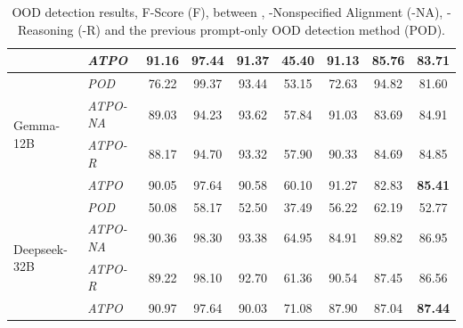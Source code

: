\begin{table}[t!]
{\begin{tabular}{|l|l|ccccccc|}
                             &  \cellcolor{rowGray} \textit{ATPO}  &  \cellcolor{rowGray} 91.16 &  \cellcolor{rowGray} 97.44 &   \cellcolor{rowGray} 91.37 & \cellcolor{rowGray} 45.40 &  \cellcolor{rowGray} 91.13 &   \cellcolor{rowGray} 85.76 &    \multicolumn{1}{|c|}{\cellcolor{rowGray} \textbf{83.71}}  \\  \hline
\multirow{4}{*}{Gemma-12B}   &   \textit{POD}   &   76.22  &    99.37  &   93.44  &    53.15  &   72.63  &   94.82  &    \multicolumn{1}{|c|}{81.60} \\
                             &  \cellcolor{rowGray} \textit{ATPO-NA}  &   \cellcolor{rowGray} 89.03 &    \cellcolor{rowGray} 94.23 &  \cellcolor{rowGray} 93.62 &  \cellcolor{rowGray} 57.84 &    \cellcolor{rowGray} 91.03 &  \cellcolor{rowGray} 83.69 &    \multicolumn{1}{|c|}{ \cellcolor{rowGray} 84.91} \\ %
                             &  \cellcolor{rowGray} \textit{ATPO-R}  &   \cellcolor{rowGray} 88.17 &   \cellcolor{rowGray} 94.70 &  \cellcolor{rowGray} 93.32 &  \cellcolor{rowGray} 57.90 &   \cellcolor{rowGray} 90.33 &   \cellcolor{rowGray} 84.69 &    \multicolumn{1}{|c|}{ \cellcolor{rowGray} 84.85} \\
                             &  \cellcolor{rowGray} \textit{ATPO}  &   \cellcolor{rowGray} 90.05 &  \cellcolor{rowGray} 97.64 &   \cellcolor{rowGray} 90.58 & \cellcolor{rowGray} 60.10 &  \cellcolor{rowGray} 91.27 &   \cellcolor{rowGray} 82.83 &   \multicolumn{1}{|c|}{\cellcolor{rowGray} \textbf{85.41}}  \\  \hline
\multirow{4}{*}{Deepseek-32B}   &  \textit{POD}        &   50.08  &   58.17  &    52.50  &   37.49  &    56.22  &  62.19 &   \multicolumn{1}{|c|}{52.77} \\
                             &  \cellcolor{rowGray} \textit{ATPO-NA}  &    \cellcolor{rowGray} 90.36 &   \cellcolor{rowGray} 98.30 &    \cellcolor{rowGray} 93.38  &    \cellcolor{rowGray} 64.95  &   \cellcolor{rowGray} 84.91  &   \cellcolor{rowGray} 89.82  &    \multicolumn{1}{|c|}{\cellcolor{rowGray} 86.95} \\ %
                             &  \cellcolor{rowGray} \textit{ATPO-R}  &   \cellcolor{rowGray} 89.22  &   \cellcolor{rowGray} 98.10  &   \cellcolor{rowGray} 92.70 &   \cellcolor{rowGray} 61.36 &   \cellcolor{rowGray} 90.54 &   \cellcolor{rowGray} 87.45 &   \multicolumn{1}{|c|}{\cellcolor{rowGray} 86.56} \\
                             &  \cellcolor{rowGray} \textit{ATPO}  &   \cellcolor{rowGray} 90.97 & \cellcolor{rowGray} 97.64 &   \cellcolor{rowGray} 90.03 &  \cellcolor{rowGray} 71.08 & \cellcolor{rowGray} 87.90 &  \cellcolor{rowGray} 87.04 &    \multicolumn{1}{|c|}{\cellcolor{rowGray} \textbf{87.44}}  \\  \hline
\end{tabular}
}
\caption{OOD detection results, F-Score (F), between \syst, \syst-Nonspecified Alignment (\syst-NA), \syst-Reasoning (\syst-R) and the previous prompt-only OOD detection method (POD). %
}
\label{tab:atpo_results_promptonly_f}
\end{table}

